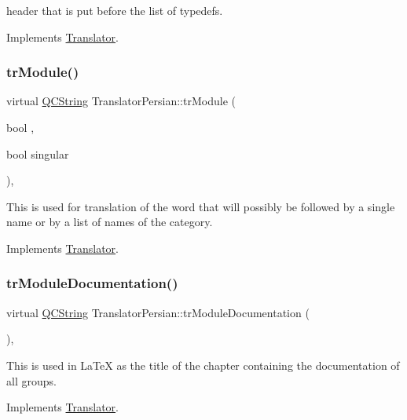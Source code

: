 header that is put before the list of typedefs. 

Implements \mbox{\hyperlink{class_translator}{Translator}}.

\mbox{\label{class_translator_persian_aa2d31e99887be189d227e4c58af3bcae}} 
\subsubsection{\texorpdfstring{trModule()}{trModule()}}
{\footnotesize\ttfamily virtual \mbox{\hyperlink{class_q_c_string}{Q\+C\+String}} Translator\+Persian\+::tr\+Module (\begin{DoxyParamCaption}\item[{bool}]{,  }\item[{bool}]{singular }\end{DoxyParamCaption})\hspace{0.3cm}{\ttfamily [inline]}, {\ttfamily [virtual]}}

This is used for translation of the word that will possibly be followed by a single name or by a list of names of the category. 

Implements \mbox{\hyperlink{class_translator}{Translator}}.

\mbox{\label{class_translator_persian_a69d2b7621f395bf43dbd6b318dd27e0c}} 
\subsubsection{\texorpdfstring{trModuleDocumentation()}{trModuleDocumentation()}}
{\footnotesize\ttfamily virtual \mbox{\hyperlink{class_q_c_string}{Q\+C\+String}} Translator\+Persian\+::tr\+Module\+Documentation (\begin{DoxyParamCaption}{ }\end{DoxyParamCaption})\hspace{0.3cm}{\ttfamily [inline]}, {\ttfamily [virtual]}}

This is used in La\+TeX as the title of the chapter containing the documentation of all groups. 

Implements \mbox{\hyperlink{class_translator}{Translator}}.

